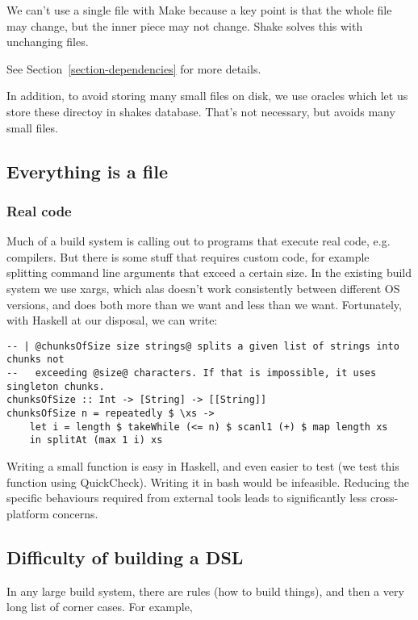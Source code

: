 We can't use a single file with Make because a key point is that the whole file may change,
but the inner piece may not change. Shake solves this with unchanging files.

See Section~\ref{section-dependencies} for more details.

In addition, to avoid storing many small files on disk, we use oracles which let us store these directoy in shakes database. That's not necessary, but avoids many small files.

\subsection{Everything is a file}


\subsubsection{Real code}

Much of a build system is calling out to programs that execute real code, e.g. compilers. But there is some stuff that requires custom code, for example splitting command line arguments that exceed a certain size. In the existing build system we use xargs, which alas doesn't work consistently between different OS versions, and does both more than we want and less than we want. Fortunately, with Haskell at our disposal, we can write:

\begin{lstlisting}
-- | @chunksOfSize size strings@ splits a given list of strings into chunks not
--   exceeding @size@ characters. If that is impossible, it uses singleton chunks.
chunksOfSize :: Int -> [String] -> [[String]]
chunksOfSize n = repeatedly $ \xs ->
    let i = length $ takeWhile (<= n) $ scanl1 (+) $ map length xs
    in splitAt (max 1 i) xs
\end{lstlisting}

Writing a small function is easy in Haskell, and even easier to test (we test this function using QuickCheck). Writing it in bash would be infeasible. Reducing the specific behaviours required from external tools leads to significantly less cross-platform concerns.

\subsection{Difficulty of building a DSL}

In any large build system, there are rules (how to build things), and then a very long list of corner cases. For example,

